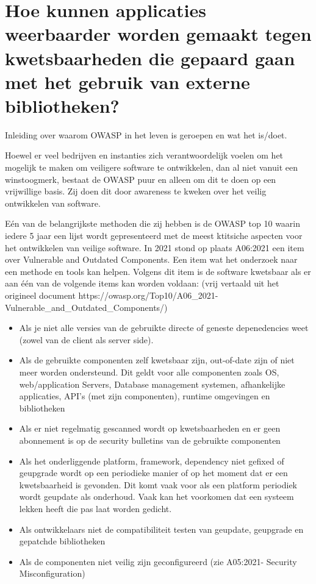 \section{Hoe kunnen applicaties weerbaarder worden gemaakt tegen kwetsbaarheden die gepaard gaan met het gebruik van externe bibliotheken?}\label{sec:hoe-kan-er-voorkomen-worden-dat-er-kkwetsbaarheden-onstaan-in-een-applicatie-die-gebruik-maakt-van-externe-bibliotheken?}

Inleiding over waarom OWASP in het leven is geroepen en wat het is/doet.

Hoewel er veel bedrijven en instanties zich verantwoordelijk voelen om het mogelijk te maken om veiligere software te ontwikkelen, dan al niet vanuit een winstoogmerk, bestaat de OWASP puur en alleen om dit te doen op een vrijwillige basis. Zij doen dit door awareness te kweken over het veilig ontwikkelen van software.

Eén van de belangrijkste methoden die zij hebben is de OWASP top 10 waarin iedere 5 jaar een lijst wordt gepresenteerd met de meest ktitsiche aspecten voor het ontwikkelen van veilige software. In 2021 stond op plaats A06:2021 een item over Vulnerable and Outdated Components. Een item wat het onderzoek naar een methode en tools kan helpen. Volgens dit item is de software kwetsbaar als er aan één van de volgende items kan worden voldaan: (vrij vertaald uit het origineel document https://owasp.org/Top10/A06\_2021-Vulnerable\_and\_Outdated\_Components/)
\begin{itemize}
    \item Als je niet alle versies van de gebruikte directe of geneste depenedencies weet (zowel van de client als server side).
    \item Als de gebruikte componenten zelf kwetsbaar zijn, out-of-date zijn of niet meer worden ondersteund. Dit geldt voor alle componenten zoals OS, web/application Servers, Database management systemen, afhankelijke applicaties, API's (met zijn componenten), runtime omgevingen en bibliotheken
    \item Als er niet regelmatig gescanned wordt op kwetsbaarheden en er geen abonnement is op de security bulletins van de gebruikte componenten
    \item Als het onderliggende platform, framework, dependency niet gefixed of geupgrade wordt op een periodieke manier of op het moment dat er een kwetsbaarheid is gevonden. Dit komt vaak voor als een platform periodiek wordt geupdate als onderhoud. Vaak kan het voorkomen dat een systeem lekken heeft die pas laat worden gedicht.
    \item Als ontwikkelaars niet de compatibiliteit testen van geupdate, geupgrade en gepatchde bibliotheken
    \item Als de componenten niet veilig zijn geconfigureerd (zie A05:2021- Security Misconfiguration)
\end{itemize}

